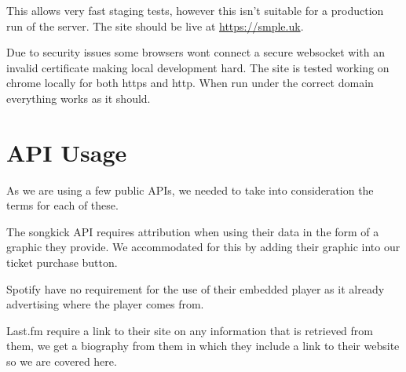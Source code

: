 \documentclass[10pt]{article}
\begin{document}
        This allows very fast staging tests, however this isn't suitable for a production run of the server. The site should be live at \href{https://smple.uk}{https://smple.uk}.

        Due to security issues some browsers wont connect a secure websocket with an invalid certificate making local development hard. The site is tested working on chrome locally for both https and http. When run under the correct domain everything works as it should.

    \section{API Usage}
        As we are using a few public APIs, we needed to take into consideration the terms for each of these.

        The songkick API requires attribution when using their data in the form of a graphic they provide. We accommodated for this by adding their graphic into our ticket purchase button.

        Spotify have no requirement for the use of their embedded player as it already advertising where the player comes from.

        Last.fm require a link to their site on any information that is retrieved from them, we get a biography from them in which they include a link to their website so we are covered here.
\end{document}

